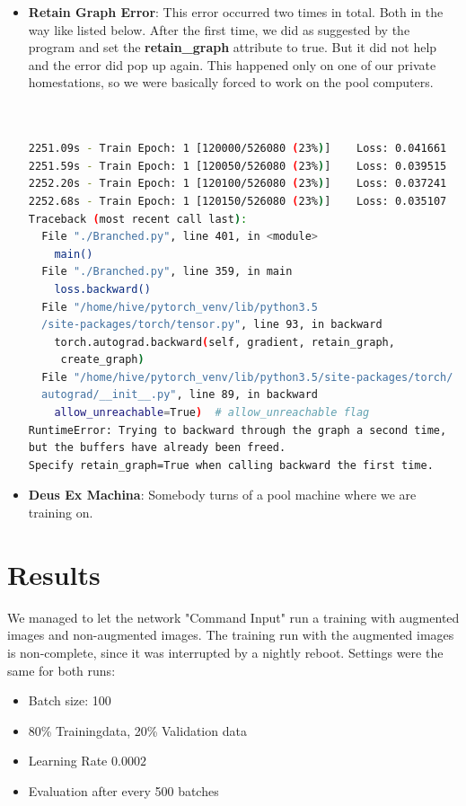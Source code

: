\documentclass[a4paper]{article}
\begin{document}
\begin{itemize}
\begin{lstlisting}[language=bash, caption={Nigthly Reboot Interruption}]
\end{lstlisting}

\item \textbf{Retain Graph Error}: This error occurred two times in total. Both in the way like listed below. After the first time, we did as suggested by the program and set the \textbf{retain\_graph} attribute to true. But it did not help and the error did pop up again. This happened only on one of our private homestations, so we were basically forced to work on the pool computers.

\begin{lstlisting}[language=bash, caption={Nigthly Reboot Interruption}]


2251.09s - Train Epoch: 1 [120000/526080 (23%)]    Loss: 0.041661
2251.59s - Train Epoch: 1 [120050/526080 (23%)]    Loss: 0.039515
2252.20s - Train Epoch: 1 [120100/526080 (23%)]    Loss: 0.037241
2252.68s - Train Epoch: 1 [120150/526080 (23%)]    Loss: 0.035107
Traceback (most recent call last):
  File "./Branched.py", line 401, in <module>
    main()
  File "./Branched.py", line 359, in main
    loss.backward()
  File "/home/hive/pytorch_venv/lib/python3.5
  /site-packages/torch/tensor.py", line 93, in backward
    torch.autograd.backward(self, gradient, retain_graph,
     create_graph)
  File "/home/hive/pytorch_venv/lib/python3.5/site-packages/torch/
  autograd/__init__.py", line 89, in backward
    allow_unreachable=True)  # allow_unreachable flag
RuntimeError: Trying to backward through the graph a second time, 
but the buffers have already been freed. 
Specify retain_graph=True when calling backward the first time.

\end{lstlisting}

\item \textbf{Deus Ex Machina}: Somebody turns of a pool machine where we are training on.



\end{itemize}

\clearpage

\section{Results}
We managed to let the network "Command Input" run a training with augmented images and non-augmented images.
The training run with the augmented images is non-complete, since it was interrupted by a nightly reboot.
Settings were the same for both runs:
\begin{itemize}
	\item Batch size: 100
	\item 80\% Trainingdata, 20\% Validation data
	\item Learning Rate $0.0002$
	\item Evaluation after every 500 batches
	
	
\end{itemize}
\end{document}
